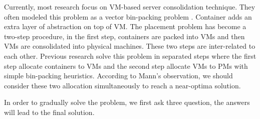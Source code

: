 Currently, most research focus on VM-based server consolidation technique. They often modeled this problem as a vector bin-packing problem \cite{Zhang:2016cx}. Container adds an extra layer of abstraction on top of VM. The placement problem has become a two-step procedure, in the first step, containers are packed into VMs and then VMs are consolidated into physical machines. These two steps are inter-related to each other. Previous research \cite{Piraghaj:2015uf} solve this problem in separated steps where the first step allocate containers to VMs and the second step allocate VMs to PMs with simple bin-packing heuristics. According to Mann's \cite{Mann:2016hx} observation, we should consider these two allocation simultaneously to reach a near-optima solution. 


In order to gradually solve the problem, we first ask three question, the answers will lead to the final solution.
